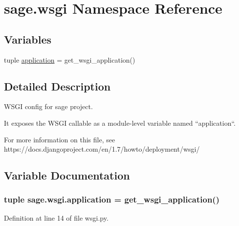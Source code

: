 \hypertarget{a00045}{}\section{sage.\+wsgi Namespace Reference}
\label{a00045}
\subsection*{Variables}
\begin{DoxyCompactItemize}
\item 
tuple \hyperlink{a00045_a1ddb23bace7377dbda42c61a804bb9aa}{application} = get\+\_\+wsgi\+\_\+application()
\end{DoxyCompactItemize}


\subsection{Detailed Description}
\begin{DoxyVerb}WSGI config for sage project.

It exposes the WSGI callable as a module-level variable named ``application``.

For more information on this file, see
https://docs.djangoproject.com/en/1.7/howto/deployment/wsgi/
\end{DoxyVerb}
 

\subsection{Variable Documentation}
\hypertarget{a00045_a1ddb23bace7377dbda42c61a804bb9aa}{}
\subsubsection[{application}]{\setlength{\rightskip}{0pt plus 5cm}tuple sage.\+wsgi.\+application = get\+\_\+wsgi\+\_\+application()}\label{a00045_a1ddb23bace7377dbda42c61a804bb9aa}


Definition at line 14 of file wsgi.\+py.

